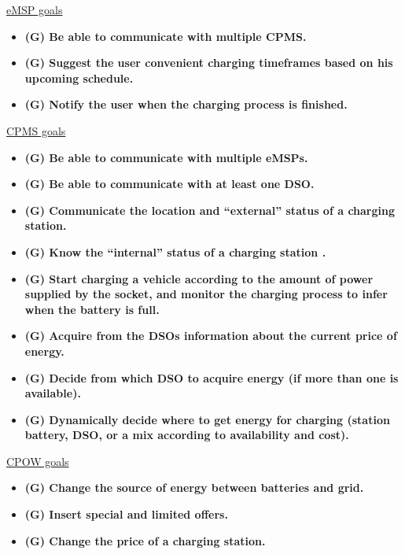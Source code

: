 \documentclass[table, 12pt]{article} %
\begin{document}
        \newpage
        \underline{eMSP goals}
        \begin{itemize}
            \item  \textbf{(G) Be able to communicate with multiple CPMS.}
            \item  \textbf{(G) Suggest the user convenient charging timeframes based on his upcoming schedule.}
            \item  \textbf{(G) Notify the user when the charging process is finished.}
        \end{itemize}
        
        \underline{CPMS goals}
        \begin{itemize}
            \item  \textbf{(G) Be able to communicate with multiple eMSPs.}
            \item  \textbf{(G) Be able to communicate with at least one DSO.}
            \item  \textbf{(G) Communicate the location and “external” status of a charging station.}
            \item  \textbf{(G) Know the “internal” status of a charging station .}
            \item  \textbf{(G) Start charging a vehicle according to the amount of power supplied by the socket, and monitor the charging process to infer when the battery is full.}
            \item  \textbf{(G) Acquire from the DSOs information about the current price of energy.}
            \item  \textbf{(G) Decide from which DSO to acquire energy (if more than one is available).}
            \item  \textbf{(G) Dynamically decide where to get energy for charging (station battery, DSO, or a mix according to availability and cost).}
        \end{itemize}

        \underline{CPOW goals}
        \begin{itemize}
            \item  \textbf{(G) Change the source of energy between batteries and grid.}
            \item  \textbf{(G) Insert special and limited offers.}
            \item  \textbf{(G) Change the price of a charging station.}
        \end{itemize}
\end{document}
